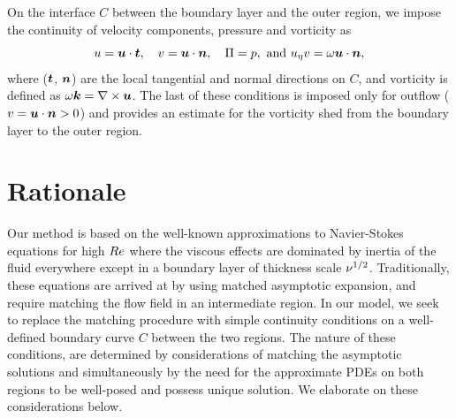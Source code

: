On the interface $C$ between the boundary layer and the outer region, we impose the continuity of velocity components, pressure and vorticity as
\begin{equation}
 u = \boldsymbol{u} \cdot \boldsymbol{t}, \quad v = \boldsymbol{u} \cdot \boldsymbol{n},  \quad \Pi = p, \text{ and } u_{\eta} v = \omega \boldsymbol{u} \cdot \boldsymbol{n},
\label{eqn:matchingbcs}
\end{equation}
where ($\boldsymbol{t}$, $\boldsymbol{n}$) are the local tangential and normal directions on $C$, and vorticity is defined as $\omega \boldsymbol{k} = \nabla \times \boldsymbol{u}$. 
The last of these conditions is imposed only for outflow ($v = \boldsymbol{u} \cdot \boldsymbol{n} > 0$) and provides an estimate for the vorticity shed from the boundary layer to the outer region.


\section{Rationale}

Our method is based on the well-known approximations to Navier-Stokes equations for high $Re$ where the viscous effects are dominated by inertia of the fluid everywhere except in a boundary layer of thickness scale $\nu^{1/2}$. 
Traditionally, these equations are arrived at by using matched asymptotic expansion, and require matching the flow field in an intermediate region.
In our model, we seek to replace the matching procedure with simple continuity conditions on a well-defined boundary curve $C$ between the two regions.
The nature of these conditions, are determined by considerations of matching the asymptotic solutions and simultaneously by the need for the approximate PDEs on both regions to be well-posed and possess unique solution.
We elaborate on these considerations below.

